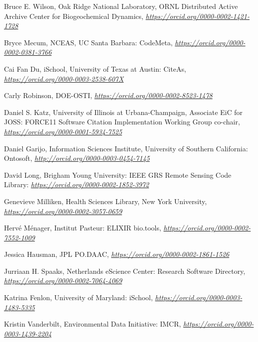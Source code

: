 \documentclass[]{article}
\begin{document}
Bruce E. Wilson, Oak Ridge National Laboratory, ORNL Distributed Active
Archive Center for Biogeochemical Dynamics,
\href{https://orcid.org/0000-0002-1421-1728}{\emph{https://orcid.org/0000-0002-1421-1728}}

Bryce Mecum, NCEAS, UC Santa Barbara: CodeMeta,
\href{https://orcid.org/0000-0002-0381-3766}{\emph{https://orcid.org/0000-0002-0381-3766}}

Cai Fan Du, iSchool, University of Texas at Austin: CiteAs,
\href{https://orcid.org/0000-0003-2538-607X}{\emph{https://orcid.org/0000-0003-2538-607X}}

Carly Robinson, DOE-OSTI,
\href{https://orcid.org/0000-0002-8523-1478}{\emph{https://orcid.org/0000-0002-8523-1478}}

Daniel S. Katz, University of Illinois at Urbana-Champaign, Associate
EiC for JOSS: FORCE11 Software Citation Implementation Working Group
co-chair,
\href{https://orcid.org/0000-0001-5934-7525}{\emph{https://orcid.org/0000-0001-5934-7525}}

Daniel Garijo, Information Sciences Institute, University of Southern
California: Ontosoft,
\href{http://orcid.org/0000-0003-0454-7145}{\emph{http://orcid.org/0000-0003-0454-7145}}

David Long, Brigham Young University: IEEE GRS Remote Sensing Code
Library:
\href{https://orcid.org/0000-0002-1852-3972}{\emph{https://orcid.org/0000-0002-1852-3972}}

Genevieve Milliken, Health Sciences Library, New York University,
\href{https://orcid.org/0000-0002-3057-0659}{\emph{https://orcid.org/0000-0002-3057-0659}}

Hervé Ménager, Institut Pasteur: ELIXIR bio.tools,
\href{https://orcid.org/0000-0002-7552-1009}{\emph{https://orcid.org/0000-0002-7552-1009}}

Jessica Hausman, JPL PO.DAAC,
\href{https://orcid.org/0000-0002-1861-1526}{\emph{https://orcid.org/0000-0002-1861-1526}}

Jurriaan H. Spaaks, Netherlands eScience Center: Research Software
Directory,
\href{https://orcid.org/0000-0002-7064-4069}{\emph{https://orcid.org/0000-0002-7064-4069}}

Katrina Fenlon, University of Maryland: iSchool,
\href{https://orcid.org/0000-0003-1483-5335}{\emph{https://orcid.org/0000-0003-1483-5335}}

Kristin Vanderbilt, Environmental Data Initiative: IMCR,
\href{https://orcid.org/0000-0003-1439-2204}{\emph{https://orcid.org/0000-0003-1439-2204}}
\end{document}
